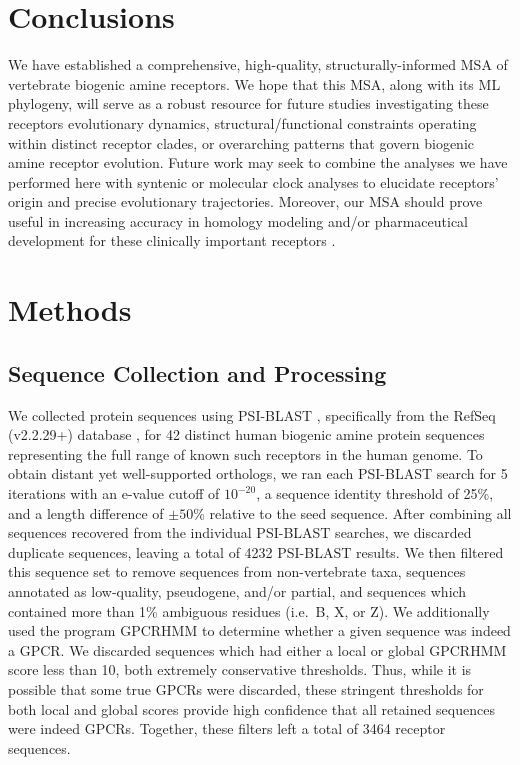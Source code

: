 \documentclass[fleqn,10pt]{wlpeerj}
\begin{document}
\section*{Conclusions}

We have established a comprehensive, high-quality, structurally-informed MSA of vertebrate biogenic amine receptors. We hope that this MSA, along with its ML phylogeny, will serve as a robust resource for future studies investigating these receptors evolutionary dynamics, structural/functional constraints operating within distinct receptor clades, or overarching patterns that govern biogenic amine receptor evolution. Future work may seek to combine the analyses we have performed here with syntenic or molecular clock analyses to elucidate receptors' origin and precise evolutionary trajectories. Moreover, our MSA should prove useful in increasing accuracy in homology modeling and/or pharmaceutical development for these clinically important receptors \citep{Kristiansen2004,Ishiguro2004,Eversetal2005,Masonetal2012}.




\section*{Methods}

\subsection*{Sequence Collection and Processing}
We collected protein sequences using PSI-BLAST \citep{psiblast}, specifically from the RefSeq (v2.2.29+) database \citep{refseq}, for 42 distinct human biogenic amine protein sequences representing the full range of known such receptors in the human genome. To obtain distant yet well-supported orthologs, we ran each PSI-BLAST search for 5 iterations with an e-value cutoff of $10^{-20}$, a sequence identity threshold of 25\%, and a length difference of $\pm50$\% relative to the seed sequence. After combining all sequences recovered from the individual PSI-BLAST searches, we discarded duplicate sequences, leaving a total of 4232 PSI-BLAST results. We then filtered this sequence set to remove sequences from non-vertebrate taxa, sequences annotated as low-quality, pseudogene, and/or partial, and sequences which contained more than 1\% ambiguous residues (i.e.\ B, X, or Z). We additionally used the program GPCRHMM \citep{Wistrand2006} to determine whether a given sequence was indeed a GPCR. We discarded sequences which had either a local or global GPCRHMM score less than 10, both extremely conservative thresholds. Thus, while it is possible that some true GPCRs were discarded, these stringent thresholds for both local and global scores provide high confidence that all retained sequences were indeed GPCRs. Together, these filters left a total of 3464 receptor sequences.
\end{document}
